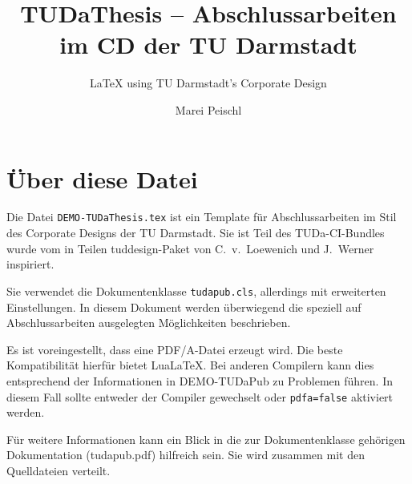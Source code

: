 \documentclass[
	ngerman,
	ruledheaders=section,%
	class=report,%
	thesis={type=bachelor},%
	accentcolor=9c,%
	custommargins=true,%
	marginpar=false,%
	parskip=half-,%
	fontsize=11pt,%
]{tudapub}
\let\file\texttt
\let\code\texttt
\begin{document}

\title{TUDaThesis -- Abschlussarbeiten im CD der TU Darmstadt}
\subtitle{\LaTeX{} using TU Darmstadt's Corporate Design}
\author[M. Peischl]{Marei Peischl}%


\submissiondate{\today}
\examdate{\today}


\maketitle

\affidavit

\tableofcontents


\chapter{Über diese Datei}
Die Datei \file{DEMO-TUDaThesis.tex} ist ein Template für Abschlussarbeiten im Stil des Corporate Designs der TU Darmstadt.
Sie ist Teil des TUDa-CI-Bundles wurde vom in Teilen tuddesign-Paket von C.~v.~Loewenich und J.~Werner inspiriert.

Sie verwendet die Dokumentenklasse \file{tudapub.cls}, allerdings mit erweiterten Einstellungen. In diesem Dokument werden überwiegend die speziell auf Abschlussarbeiten ausgelegten Möglichkeiten beschrieben.

Es ist voreingestellt, dass eine PDF/A-Datei erzeugt wird. Die beste Kompatibilität hierfür bietet Lua\LaTeX. Bei anderen Compilern kann dies entsprechend der Informationen in DEMO-TUDaPub zu Problemen führen. In diesem Fall sollte entweder der Compiler gewechselt oder \code{pdfa=false} aktiviert werden.

Für weitere Informationen kann ein Blick in die zur Dokumentenklasse gehörigen Dokumentation (tudapub.pdf) hilfreich sein. Sie wird zusammen mit den Quelldateien verteilt.
\end{document}
